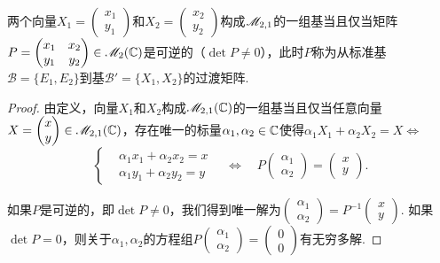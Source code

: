   \begin{lemma}
    两个向量$X_1=\begin{pmatrix}
    x_1 \\ y_1
  \end{pmatrix}$和$X_2=\begin{pmatrix}
    x_2 \\ y_2
  \end{pmatrix}$构成$\mathscr M_{2,1}$的一组基当且仅当矩阵$P=\begin{pmatrix}
      x_1 & x_2 \\ y_1 & y_2
    \end{pmatrix}\in\mathscr M_2(\mathbb C)$是可逆的（$\det P\ne0$），此时$P$称为从标准基$\mathscr B=\{E_1,E_2\}$到基$\mathscr B'=\{X_1,X_2\}$的过渡矩阵.
  \end{lemma}
  \begin{proof}
    由定义，向量$X_1$和$X_2$构成$\mathscr M_{2,1}(\mathbb C)$的一组基当且仅当任意向量$X=\begin{pmatrix}
      x \\ y
    \end{pmatrix}\in\mathscr M_{2,1}(\mathbb C)$，存在唯一的标量$\alpha_1,\alpha_2\in\mathbb C$使得$\alpha_1X_1+\alpha_2X_2=X\Leftrightarrow$
    \[
      \left\{
        \begin{aligned}
          & \alpha_1x_1 + \alpha_2x_2 = x\\
          & \alpha_1y_1 + \alpha_2y_2 = y
        \end{aligned}
      \right.\quad \Leftrightarrow\quad
      P\begin{pmatrix}
        \alpha_1 \\ \alpha_2
      \end{pmatrix} = \begin{pmatrix}
        x \\ y
      \end{pmatrix}.
    \]

    如果$P$是可逆的，即$\det P\ne0$，我们得到唯一解为$\begin{pmatrix}
      \alpha_1 \\ \alpha_2
    \end{pmatrix}=P^{-1}\begin{pmatrix}
      x \\ y
    \end{pmatrix}$. 如果$\det P=0$，则关于$\alpha_1,\alpha_2$的方程组$P\begin{pmatrix}
      \alpha_1 \\ \alpha_2
    \end{pmatrix}=\begin{pmatrix}
      0 \\ 0
    \end{pmatrix}$有无穷多解.
  \end{proof}

